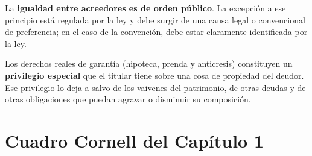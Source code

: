 \documentclass[12pt,oneside]{book}
\begin{document}
La \textbf{igualdad entre acreedores es de orden público}. La excepción a ese principio está regulada por la ley y debe surgir de una causa legal o convencional de preferencia; en el caso de la convención, debe estar claramente identificada por la ley.

Los derechos reales de garantía (hipoteca, prenda y anticresis) constituyen un \textbf{privilegio especial} que el titular tiene sobre una cosa de propiedad del deudor. Ese privilegio lo deja a salvo de los vaivenes del patrimonio, de otras deudas y de otras obligaciones que puedan agravar o disminuir su composición.

\section{Cuadro Cornell del Capítulo 1}
\end{document}
